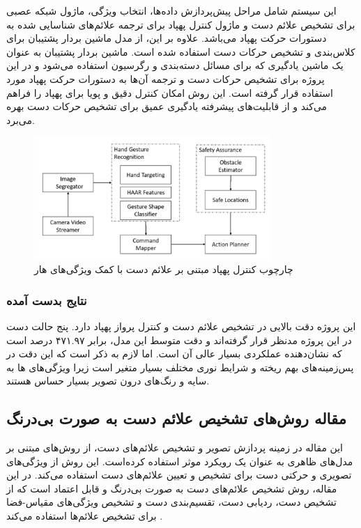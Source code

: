 این سیستم شامل مراحل پیش‌پردازش داده‌ها، انتخاب ویژگی، ماژول شبکه عصبی برای تشخیص علائم دست و ماژول کنترل پهپاد برای ترجمه 
علائم‌های شناسایی شده به دستورات حرکت پهپاد می‌باشد. علاوه بر این، از مدل ماشین بردار پشتیبان برای کلاس‌بندی و تشخیص حرکات دست استفاده شده است. ماشین بردار پشتیبان به عنوان یک ماشین یادگیری 
 که برای مسائل دسته‌بندی و رگرسیون استفاده می‌شود و در این پروژه برای تشخیص حرکات دست و ترجمه آن‌ها به دستورات حرکت پهپاد مورد استفاده قرار گرفته است. این روش امکان 
کنترل دقیق و پویا برای پهپاد را فراهم می‌کند و از قابلیت‌های پیشرفته یادگیری عمیق برای تشخیص حرکات دست بهره می‌برد.

\begin{figure}[h]
    \centering
    \includegraphics[width=0.8\textwidth]{Haar2.png}
    \caption[چارچوب کنترل پهپاد مبتنی بر علائم دست با کمک ویژگی‌های هار]{چارچوب کنترل پهپاد مبتنی بر علائم دست با کمک ویژگی‌های هار\cite{natarajan2018hand}}
\end{figure}

\subsubsection{\protect\textbf{ نتایج بدست آمده}}
این پروژه دقت بالایی در تشخیص علائم دست و کنترل پرواز پهپاد دارد. پنج حالت دست در این پروژه مدنظر قرار گرفته‌اند و دقت متوسط این مدل، برابر ۴۷۱.۹۷ درصد 
است که نشان‌دهنده عملکردی بسیار عالی آن است. اما لازم به ذکر است که این دقت در پس‌زمینه‌های بهم ریخته و شرایط نوری مختلف 
بسیار متغیر است زیرا ویژگی‌های ها به سایه و رنگ‌های درون تصویر بسیار حساس هستند.



\subsection[مقاله روش‌های تشخیص علائم دست به صورت بی‌درنگ]{مقاله روش‌های تشخیص علائم دست به صورت بی‌درنگ \protect{}}
این مقاله در زمینه پردازش تصویر و تشخیص علائم‌های دست، از روش‌های مبتنی بر مدل‌های ظاهری به عنوان یک رویکرد موثر استفاده کرده‌‌است.
این روش‌ از ویژگی‌های تصویری و حرکتی دست برای تشخیص و تعیین علائم‌های دست استفاده می‌کند. در این مقاله، روش تشخیص علائم‌های دست به صورت بی‌درنگ و 
قابل اعتماد است که از تشخیص دست، ردیابی دست، تقسیم‌بندی دست و تشخیص ویژگی‌های مقیاس-فضا برای تشخیص علائم‌ها استفاده می‌کند \cite{fang2007real}.

